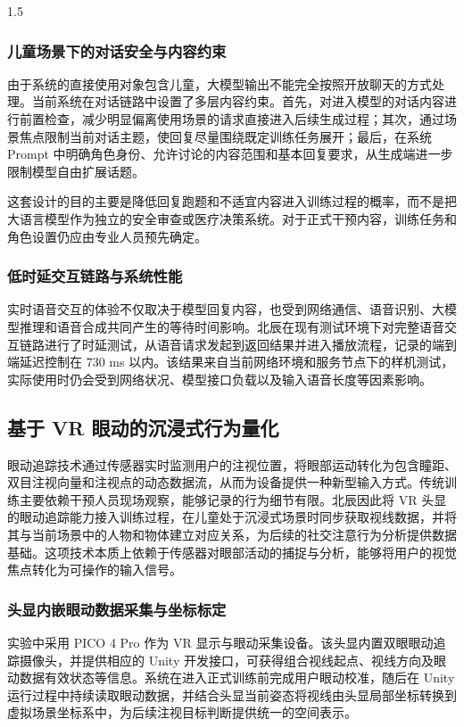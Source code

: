 \documentclass[zihao=-4]{ctexart}
\begin{document}
\begin{spacing}{1.5}
\subsubsection{儿童场景下的对话安全与内容约束}

由于系统的直接使用对象包含儿童，大模型输出不能完全按照开放聊天的方式处理。当前系统在对话链路中设置了多层内容约束。首先，对进入模型的对话内容进行前置检查，减少明显偏离使用场景的请求直接进入后续生成过程；其次，通过场景焦点限制当前对话主题，使回复尽量围绕既定训练任务展开；最后，在系统 Prompt 中明确角色身份、允许讨论的内容范围和基本回复要求，从生成端进一步限制模型自由扩展话题。

这套设计的目的主要是降低回复跑题和不适宜内容进入训练过程的概率，而不是把大语言模型作为独立的安全审查或医疗决策系统。对于正式干预内容，训练任务和角色设置仍应由专业人员预先确定。

\subsubsection{低时延交互链路与系统性能}

实时语音交互的体验不仅取决于模型回复内容，也受到网络通信、语音识别、大模型推理和语音合成共同产生的等待时间影响。北辰在现有测试环境下对完整语音交互链路进行了时延测试，从语音请求发起到返回结果并进入播放流程，记录的端到端延迟控制在 730 ms 以内。该结果来自当前网络环境和服务节点下的样机测试，实际使用时仍会受到网络状况、模型接口负载以及输入语音长度等因素影响。


\subsection{基于 VR 眼动的沉浸式行为量化}

眼动追踪技术通过传感器实时监测用户的注视位置，将眼部运动转化为包含瞳距、双目注视向量和注视点的动态数据流，从而为设备提供一种新型输入方式。传统训练主要依赖干预人员现场观察，能够记录的行为细节有限。北辰因此将 VR 头显的眼动追踪能力接入训练过程，在儿童处于沉浸式场景时同步获取视线数据，并将其与当前场景中的人物和物体建立对应关系，为后续的社交注意行为分析提供数据基础。这项技术本质上依赖于传感器对眼部活动的捕捉与分析，能够将用户的视觉焦点转化为可操作的输入信号\cite{ref40}。



\subsubsection{头显内嵌眼动数据采集与坐标标定}

实验中采用 PICO 4 Pro 作为 VR 显示与眼动采集设备。该头显内置双眼眼动追踪摄像头，并提供相应的 Unity 开发接口，可获得组合视线起点、视线方向及眼动数据有效状态等信息。系统在进入正式训练前完成用户眼动校准，随后在 Unity 运行过程中持续读取眼动数据，并结合头显当前姿态将视线由头显局部坐标转换到虚拟场景坐标系中，为后续注视目标判断提供统一的空间表示。  


\end{spacing}
\end{document}
